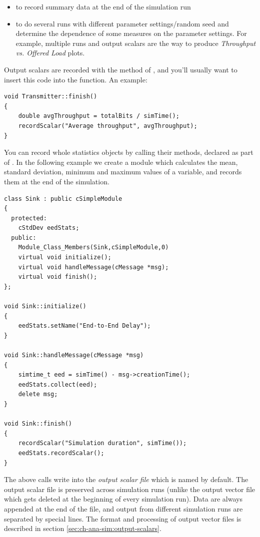 \begin{itemize}
\item{to record summary data at the end of the simulation run}
\item{to do several runs with different parameter settings/random seed
    and determine the dependence of some measures on the parameter
    settings. For example, multiple runs and output scalars are the
    way to produce \textit{Throughput vs. Offered Load} plots.}
\end{itemize}

Output scalars are recorded with the  method of
, and you'll usually want to insert this code
into the  function. An example:

\begin{verbatim}
void Transmitter::finish()
{
    double avgThroughput = totalBits / simTime();
    recordScalar("Average throughput", avgThroughput);
}
\end{verbatim}

You can record whole statistics objects by calling their 
methods, declared as part of . In the following example
we create a  module which calculates the mean, standard
deviation, minimum and maximum values of a variable, and records them at the
end of the simulation.

\begin{verbatim}
class Sink : public cSimpleModule
{
  protected:
    cStdDev eedStats;
  public:
    Module_Class_Members(Sink,cSimpleModule,0)
    virtual void initialize();
    virtual void handleMessage(cMessage *msg);
    virtual void finish();
};

void Sink::initialize()
{
    eedStats.setName("End-to-End Delay");
}

void Sink::handleMessage(cMessage *msg)
{
    simtime_t eed = simTime() - msg->creationTime();
    eedStats.collect(eed);
    delete msg;
}

void Sink::finish()
{
    recordScalar("Simulation duration", simTime());
    eedStats.recordScalar();
}
\end{verbatim}

The above calls write into the \textit{output scalar file} which is named
 by default. The output scalar file is preserved across
simulation runs (unlike the output vector file which gets deleted
at the beginning of every simulation run).
Data are always appended at the end of the file, and
output from different simulation runs are separated by special lines.
The format and processing of output vector files is described in section
\ref{sec:ch-ana-sim:output-scalars}.




